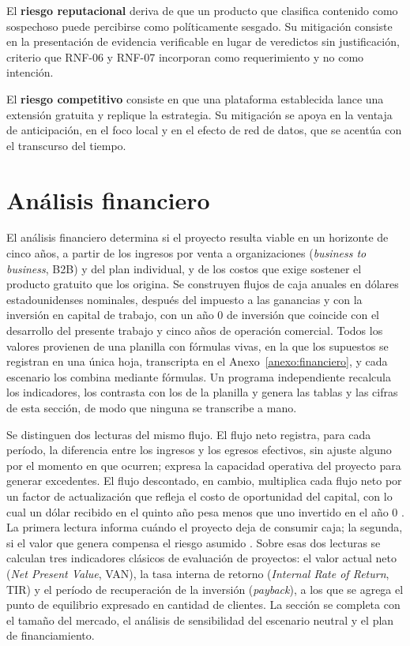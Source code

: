 El \textbf{riesgo reputacional} deriva de que un producto que clasifica contenido como sospechoso puede percibirse como políticamente sesgado. Su mitigación consiste en la presentación de evidencia verificable en lugar de veredictos sin justificación, criterio que RNF-06 y RNF-07 incorporan como requerimiento y no como intención.

El \textbf{riesgo competitivo} consiste en que una plataforma establecida lance una extensión gratuita y replique la estrategia. Su mitigación se apoya en la ventaja de anticipación, en el foco local y en el efecto de red de datos, que se acentúa con el transcurso del tiempo.

\section{Análisis financiero}
\label{sec:financiero}

El análisis financiero determina si el proyecto resulta viable en un horizonte de cinco años, a partir de los ingresos por venta a organizaciones (\textit{business to business}, B2B) y del plan individual, y de los costos que exige sostener el producto gratuito que los origina. Se construyen flujos de caja anuales en dólares estadounidenses nominales, después del impuesto a las ganancias y con la inversión en capital de trabajo, con un año 0 de inversión que coincide con el desarrollo del presente trabajo y cinco años de operación comercial. Todos los valores provienen de una planilla con fórmulas vivas, en la que los supuestos se registran en una única hoja, transcripta en el Anexo~\ref{anexo:financiero}, y cada escenario los combina mediante fórmulas. Un programa independiente recalcula los indicadores, los contrasta con los de la planilla y genera las tablas y las cifras de esta sección, de modo que ninguna se transcribe a mano.

Se distinguen dos lecturas del mismo flujo. El flujo neto registra, para cada período, la diferencia entre los ingresos y los egresos efectivos, sin ajuste alguno por el momento en que ocurren; expresa la capacidad operativa del proyecto para generar excedentes. El flujo descontado, en cambio, multiplica cada flujo neto por un factor de actualización que refleja el costo de oportunidad del capital, con lo cual un dólar recibido en el quinto año pesa menos que uno invertido en el año 0 \parencite{RossEtAl2013}. La primera lectura informa cuándo el proyecto deja de consumir caja; la segunda, si el valor que genera compensa el riesgo asumido \parencite{SapagEtAl2014}. Sobre esas dos lecturas se calculan tres indicadores clásicos de evaluación de proyectos: el valor actual neto (\textit{Net Present Value}, VAN), la tasa interna de retorno (\textit{Internal Rate of Return}, TIR) y el período de recuperación de la inversión (\textit{payback}), a los que se agrega el punto de equilibrio expresado en cantidad de clientes. La sección se completa con el tamaño del mercado, el análisis de sensibilidad del escenario neutral y el plan de financiamiento.

